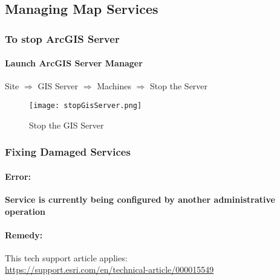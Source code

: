 \documentclass[class=book , crop=false, titlepage, twoside, multi={itemize, figure, verbatim}, float=false]{standalone}
\title{}  %
\begin{document}
\ifstandalone
\maketitle %
\tableofcontents %
\clearpage
\fi
\subsection{Managing Map Services}
\medskip

\subsubsection[Stopping the GIS Server]{To stop ArcGIS Server}
\medskip

\paragraph*{Launch ArcGIS Server Manager\texorpdfstring{\\}{}}
\noindent Site $\Rightarrow$ GIS Server $\Rightarrow$ Machines $\Rightarrow$ Stop the Server
\begin{figure}[h!]
\centering
    \texttt{[image: stopGisServer.png]}
\caption{Stop the GIS Server}
\end{figure}
\clearpage
\subsubsection[Fixing Damaged Services]{Fixing Damaged Services\texorpdfstring{\\}{}}
\paragraph*{Error: \texorpdfstring{\\}{}}
\noindent \textbf{Service is currently being configured by another administrative operation}
\paragraph*{Remedy: \texorpdfstring{\\}{}}
\noindent This tech support article applies:\\
\href{https://support.esri.com/en/technical-article/000015549}{https://support.esri.com/en/technical-article/000015549}
\vspace{.25in}
\end{document}
